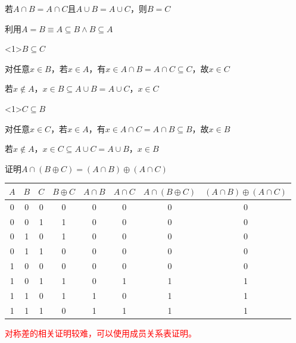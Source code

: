 \documentclass[xetex,10pt,aspectratio=43]{beamer}
\begin{document}
	\begin{frame}{若$A\cap B=A\cap C$且$A\cup B=A\cup C$，则$B=C$}
	
	利用$A=B\equiv A\subseteq B\wedge B\subseteq A$	
	
	\begin{block}{$B\subseteq C$}
	
	对任意$x\in B$，若$x\in A$，有$x\in A\cap B=A\cap C\subseteq C$，故$x\in C$
	
	若$x\notin A$，$x\in B\subseteq A\cup B=A\cup C$，$x\in C$
		
	\end{block}

	\begin{block}{$C\subseteq B$}
	
	对任意$x\in C$，若$x\in A$，有$x\in A\cap C=A\cap B\subseteq B$，故$x\in B$
	
	若$x\notin A$，$x\in C\subseteq A\cup C=A\cup B$，$x\in B$
	
	\end{block}
		
	\end{frame}

	\begin{frame}{证明$A\cap(B\oplus C)=(A\cap B)\oplus(A\cap C)$}
			
	\begin{table}
		
	\centering
	
	\begin{tabular}{|c|c|c|c|c|c|c|c|}
		\hline
		$A$ & $B$ & $C$ & $B\oplus C$ & $A\cap B$ & $A\cap C$ & $A\cap(B\oplus C)$ & $(A\cap B)\oplus(A\cap C)$\\
		\hline
		0 & 0 & 0 & 0 & 0 & 0 & 0 & 0\\
		\hline
		0 & 0 & 1 & 1 & 0 & 0 & 0 & 0\\
		\hline
		0 & 1 & 0 & 1 & 0 & 0 & 0 & 0\\
		\hline
	 	0 & 1 & 1 & 0 & 0 & 0 & 0 & 0\\
		\hline
		1 & 0 & 0 & 0 & 0 & 0 & 0 & 0\\
		\hline
		1 & 0 & 1 & 1 & 0 & 1 & 1 & 1\\
		\hline
		1 & 1 & 0 & 1 & 1 & 0 & 1 & 1\\
		\hline
		1 & 1 & 1 & 0 & 1 & 1 & 1 & 1\\
		\hline
	\end{tabular}
		
	\end{table}
	
	\textcolor{red}{对称差的相关证明较难，可以使用成员关系表证明。}
	
	\end{frame}
	
\end{document}
